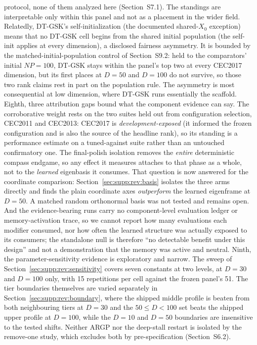 \documentclass[algorithms,article,submit,moreauthors,pdftex]{Definitions/mdpi}
\newcommand{\dtgsk}{DT-GSK}
\begin{document}
protocol, none of them analyzed here (Section~S7.1).  The standings are
interpretable only within this panel and not as a placement in the
wider field. Relatedly, \dtgsk{}'s self-initialization (the documented
shared-$X_{0}$ exception) means that no \dtgsk{} cell begins from the
shared initial population (the self-init applies at every dimension),
a disclosed fairness asymmetry.  It is bounded by the
matched-initial-population control of Section~S9.2: held to the comparators'
initial $NP = 100$, \dtgsk{} stays within the panel's top two at every
CEC2017 dimension, but its first places at $D = 50$ and $D = 100$ do not
survive, so those two rank claims rest in part on the population rule.  The
asymmetry is most consequential at low dimension, where \dtgsk{} runs
essentially the scaffold.
Eighth, three attribution gaps bound what the component evidence can say.
The corroborative weight rests on the two suites held out from
configuration selection, CEC2011 and CEC2013: CEC2017 is
\emph{development-exposed} (it
informed the frozen configuration and is also the source of the headline
rank), so its standing is a performance estimate on a tuned-against
suite rather than an untouched confirmatory one. The
final-polish isolation removes the \emph{entire} deterministic compass
endgame, so any effect it measures attaches to that phase as a whole, not to the
\emph{learned} eigenbasis it consumes.  That question is now answered for the
coordinate comparison: Section~\ref{sec:supp:rev:basis} isolates the three arms
directly and finds the plain coordinate axes \emph{outperform} the learned
eigenframe at $D = 50$.  A matched random orthonormal basis was not tested and
remains open. And the evidence-bearing runs carry no
component-level evaluation ledger or memory-activation trace, so we cannot
report how many evaluations each modifier consumed, nor how often the
learned structure was actually exposed to its consumers; the standalone
null is therefore ``no detectable benefit under this design'' and not a
demonstration that the memory was active and neutral.
Ninth, the parameter-sensitivity evidence is exploratory and narrow.  The
sweep of Section~\ref{sec:supp:rev:sensitivity} covers seven constants at two
levels, at $D = 30$ and $D = 100$ only, with 15 repetitions per cell against the
frozen panel's 51.  The tier boundaries themselves are varied separately in
Section~\ref{sec:supp:rev:boundary}, where the shipped middle profile is beaten
from both neighbouring tiers at $D = 30$ and the $50 \leq D < 100$ set beats the
shipped upper profile at $D = 100$, while the $D = 10$ and $D = 50$ boundaries are
insensitive to the tested shifts.  Neither ARGP nor the deep-stall
restart is isolated by the remove-one study, which excludes both by
pre-specification (Section~S6.2).
\end{document}
